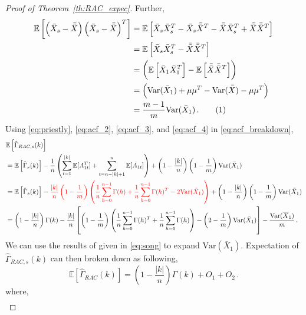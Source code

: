 \documentclass[11pt]{article}
\newcommand{\E}{\mathbb{E}}
\newcommand{\Var}{\text{Var}}
\newcommand\numberthis{\addtocounter{equation}{1}\tag{\theequation}}
\theoremstyle{remark}
\begin{document}
\begin{proof}[Proof of Theorem~\ref{th:RAC_expec}]
Further,
\begin{align*}
\mathbb{E}\left[ \left(\bar{X}_{s} - \bar{\bar{X}} \right)  \left(\bar{X}_{s} - \bar{\bar{X}} \right)^{T}\right] &= \mathbb{E}\left[ \bar{X}_{s}\bar{X}_{s}^{T} - \bar{X}_{s}\bar{\bar{X}}^{T} - \bar{\bar{X}} \bar{X}_{s}^{T} + \bar{\bar{X}}\bar{\bar{X}}^{T}\right]\\
&= \mathbb{E}\left[ \bar{X}_{s}\bar{X}_{s}^{T} - \bar{\bar{X}}\bar{\bar{X}}^{T}\right]\\
&= \left(\mathbb{E}\left[\bar{X}_{1}\bar{X}_{1}^{T}\right] - \mathbb{E}\left[\bar{\bar{X}}\bar{\bar{X}}^{T}\right]\right)\\
&= \left(\Var(\bar{X}_{1}) + \mu\mu^{T} - \Var(\bar{\bar{X}}) - \mu\mu^{T}\right)\\
&= \dfrac{m-1}{m}\Var(\bar{X}_1)\,. \numberthis \label{eq:acf_4}
\end{align*}
%
Using \eqref{eq:priestly}, \eqref{eq:acf_2}, \eqref{eq:acf_3}, and \eqref{eq:acf_4} in \eqref{eq:acf_breakdown},
\begin{align*}
    & \E \left[\hat{\Gamma}_{RAC,s}(k) \right] \\
    &= \mathbb{E}\left[\hat{\Gamma}_{s}(k)\right] - \dfrac{1}{n} \left(\sum\limits_{t=1}^{|k|}\mathbb{E}[A_{1t}^T] + \sum\limits_{t=n-|k|+1}^{n}\mathbb{E}[A_{1t}]\right) + \left(1- \dfrac{|k|}{n}\right)\left(1-\dfrac{1}{m}\right)\Var(\bar{X}_1)\\
    &= \mathbb{E}\left[\hat{\Gamma}_{s}(k)\right] - {\color{red}\dfrac{|k|}{n}\left(1-\dfrac{1}{m}\right)\left(\dfrac{1}{n}\sum_{h=0}^{n-1}\Gamma(h) + \dfrac{1}{n}\sum_{h=0}^{n-1}\Gamma(h)^T - 2 \Var(\bar{X}_1)\right)} + \left(1- \dfrac{|k|}{n}\right)\left(1-\dfrac{1}{m}\right)\Var(\bar{X}_1)\\
    &= \left(1- \dfrac{|k|}{n}\right)\Gamma(k) - \dfrac{|k|}{n}\left[\left(1-\dfrac{1}{m}\right)\left(\dfrac{1}{n}\sum_{h=0}^{n-1}\Gamma(h)^T + \dfrac{1}{n}\sum_{h=0}^{n-1}\Gamma(h)\right) - \left(2-\dfrac{1}{m}\right) \Var(\bar{X}_1)\right] - \dfrac{\Var(\overline{X}_1)}{m}\,.
\end{align*}
%
 We can use the results of \cite{song1995optimal} given in \eqref{eq:song} to expand $\Var(\bar{X}_1)$. Expectation of $\hat{\Gamma}_{RAC,s}(k)$ can then broken down as following,
 \begin{equation} \label{eq:rac_expec_breakdown}
     \mathbb{E}\left[\hat{\Gamma}_{RAC}(k)\right] = \left(1- \dfrac{|k|}{n}\right)\Gamma(k) + O_1 + O_2\,.
 \end{equation}
%
where,
\begin{align*}

\end{align*}
\end{proof}
\end{document}
